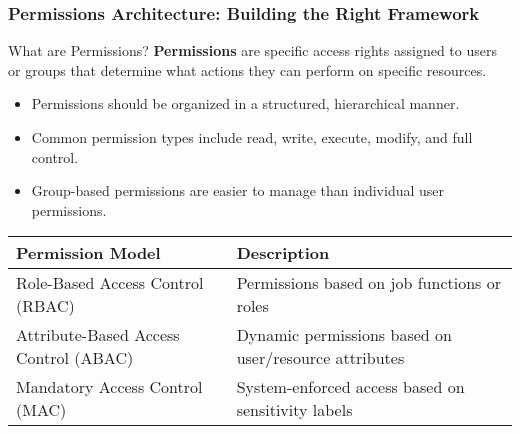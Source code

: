 \documentclass{beamer}
\begin{document}
\begin{frame}
    \frametitle{Permissions Architecture: Building the Right Framework}
    
    \begin{block}{What are Permissions?}
    \textbf{Permissions} are specific access rights assigned to users or groups that determine what actions they can perform on specific resources.
    \end{block}
    
    \begin{itemize}
    \item Permissions should be organized in a structured, hierarchical manner.
    \item Common permission types include read, write, execute, modify, and full control.
    \item Group-based permissions are easier to manage than individual user permissions.
    \end{itemize}
    
    \begin{table}
    \begin{tabularx}{\textwidth}{|l|X|}
    \hline
    \textbf{Permission Model} & \textbf{Description} \\
    \hline
    Role-Based Access Control (RBAC) & Permissions based on job functions or roles \\
    \hline
    Attribute-Based Access Control (ABAC) & Dynamic permissions based on user/resource attributes \\
    \hline
    Mandatory Access Control (MAC) & System-enforced access based on sensitivity labels \\
    \hline
    \end{tabularx}
    \end{table}
    \end{frame}
    
\end{document}

